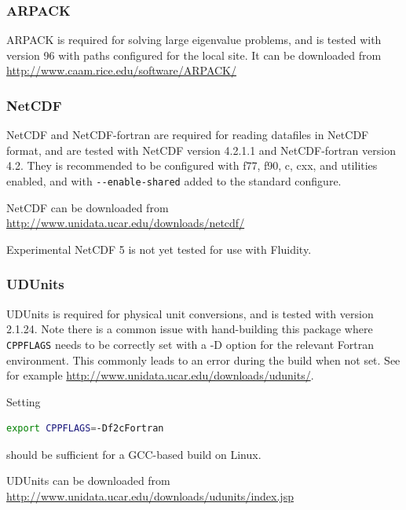 \subsubsection{ARPACK}
\label{sec:required_libraries_supporting_arpack}

ARPACK is required for solving large eigenvalue problems, and is tested with
version 96 with paths configured for the local site. It can be downloaded from
\url{http://www.caam.rice.edu/software/ARPACK/}

\subsubsection{NetCDF}
\label{sec:required_libraries_supporting_netcdf}

NetCDF and NetCDF-fortran are required for reading datafiles in NetCDF format,
and are tested with NetCDF version 4.2.1.1 and NetCDF-fortran version 4.2. They
is recommended to be configured with f77, f90, c, cxx, and utilities enabled,
and with \lstinline[language=bash]+--enable-shared+ added to the standard
configure.

NetCDF can be downloaded from \url{http://www.unidata.ucar.edu/downloads/netcdf/}

Experimental NetCDF 5 is not yet tested for use with Fluidity.

\subsubsection{UDUnits}
\label{sec:required_libraries_supporting_udunits}

UDUnits is required for physical unit conversions, and is tested with version
2.1.24. Note there is a common issue with hand-building this package where
\lstinline[language=bash]+CPPFLAGS+ needs to be correctly set with a -D
option for the relevant Fortran environment. This commonly leads to an error
during the build when not set. See for example
\url{http://www.unidata.ucar.edu/downloads/udunits/}.

Setting

\begin{lstlisting}[language=bash]
export CPPFLAGS=-Df2cFortran
\end{lstlisting}

should be sufficient for a GCC-based build on Linux.

UDUnits can be downloaded from \url{http://www.unidata.ucar.edu/downloads/udunits/index.jsp}

